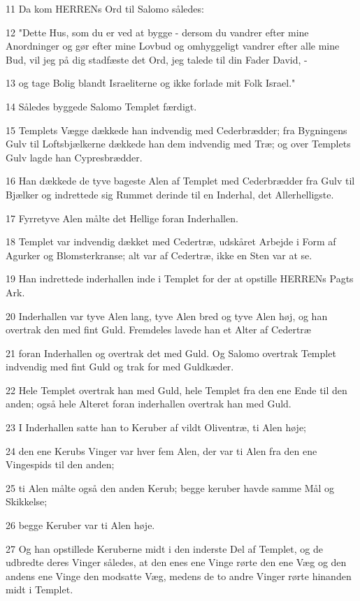 \par 11 Da kom HERRENs Ord til Salomo således:
\par 12 "Dette Hus, som du er ved at bygge - dersom du vandrer efter mine Anordninger og gør efter mine Lovbud og omhyggeligt vandrer efter alle mine Bud, vil jeg på dig stadfæste det Ord, jeg talede til din Fader David, -
\par 13 og tage Bolig blandt Israeliterne og ikke forlade mit Folk Israel."
\par 14 Således byggede Salomo Templet færdigt.
\par 15 Templets Vægge dækkede han indvendig med Cederbrædder; fra Bygningens Gulv til Loftsbjælkerne dækkede han dem indvendig med Træ; og over Templets Gulv lagde han Cypresbrædder.
\par 16 Han dækkede de tyve bageste Alen af Templet med Cederbrædder fra Gulv til Bjælker og indrettede sig Rummet derinde til en Inderhal, det Allerhelligste.
\par 17 Fyrretyve Alen målte det Hellige foran Inderhallen.
\par 18 Templet var indvendig dækket med Cedertræ, udskåret Arbejde i Form af Agurker og Blomsterkranse; alt var af Cedertræ, ikke en Sten var at se.
\par 19 Han indrettede inderhallen inde i Templet for der at opstille HERRENs Pagts Ark.
\par 20 Inderhallen var tyve Alen lang, tyve Alen bred og tyve Alen høj, og han overtrak den med fint Guld. Fremdeles lavede han et Alter af Cedertræ
\par 21 foran Inderhallen og overtrak det med Guld. Og Salomo overtrak Templet indvendig med fint Guld og trak for med Guldkæder.
\par 22 Hele Templet overtrak han med Guld, hele Templet fra den ene Ende til den anden; også hele Alteret foran inderhallen overtrak han med Guld.
\par 23 I Inderhallen satte han to Keruber af vildt Oliventræ, ti Alen høje;
\par 24 den ene Kerubs Vinger var hver fem Alen, der var ti Alen fra den ene Vingespids til den anden;
\par 25 ti Alen målte også den anden Kerub; begge keruber havde samme Mål og Skikkelse;
\par 26 begge Keruber var ti Alen høje.
\par 27 Og han opstillede Keruberne midt i den inderste Del af Templet, og de udbredte deres Vinger således, at den enes ene Vinge rørte den ene Væg og den andens ene Vinge den modsatte Væg, medens de to andre Vinger rørte hinanden midt i Templet.
